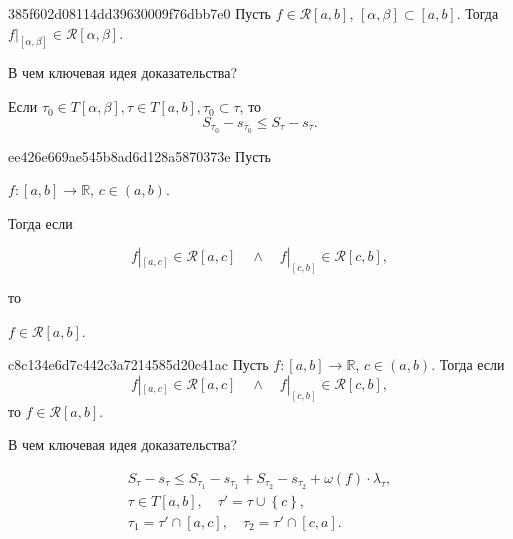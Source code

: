 \begin{note}{385f602d08114dd39630009f76dbb7e0}
    Пусть \({ f \in \mathcal R[a, b] }\), \({ [\alpha,  \beta]   \subset [a, b] }\). Тогда \({ f|_{[\alpha, \beta]} \in \mathcal R[\alpha, \beta] }\).

    В чем ключевая идея доказательства?

    \begin{cloze}{1}
        Если \({ \tau_0 \in T[\alpha, \beta], \tau \in T[a, b], \tau_0 \subset \tau }\), то
        \[
            S_{\tau_0} - s_{\tau_0} \leqslant S_{\tau} - s_{\tau}.
        \]
    \end{cloze}
\end{note}

\begin{note}{ee426e669ae545b8ad6d128a5870373e}
    Пусть \begin{icloze}{3}\({ f : [a, b] \to \mathbb R }\), \({ c \in (a, b) }\).\end{icloze} Тогда если
    \begin{icloze}{1}
        \[
            f|_{[a, c]} \in \mathcal R[a, c] \quad \land \quad f|_{[c, b]} \in \mathcal R[c, b],
        \]
    \end{icloze}
    то \begin{icloze}{2}\({ f \in \mathcal R[a, b] }\).\end{icloze}
\end{note}

\begin{note}{c8c134e6d7c442c3a7214585d20c41ac}
    Пусть \({ f : [a, b] \to \mathbb R }\), \({ c \in (a, b) }\). Тогда если
    \[
        f|_{[a, c]} \in \mathcal R[a, c] \quad \land \quad f|_{[c, b]} \in \mathcal R[c, b],
    \]
    то \({ f \in \mathcal R[a, b] }\).

    В чем ключевая идея доказательства?

    \begin{cloze}{1}
        \[
            \begin{gathered}
                S_\tau - s_\tau \leqslant S_{\tau_1} - s_{\tau_1} + S_{\tau_2} - s_{\tau_2} + \omega(f) \cdot \lambda_\tau, \\
                \tau \in T[a, b], \quad \tau' = \tau \cup \left\{ c \right\}, \\
                \tau_1 = \tau' \cap [a, c], \quad \tau_2 = \tau' \cap [c, a].
            \end{gathered}
        \]
    \end{cloze}
\end{note}


